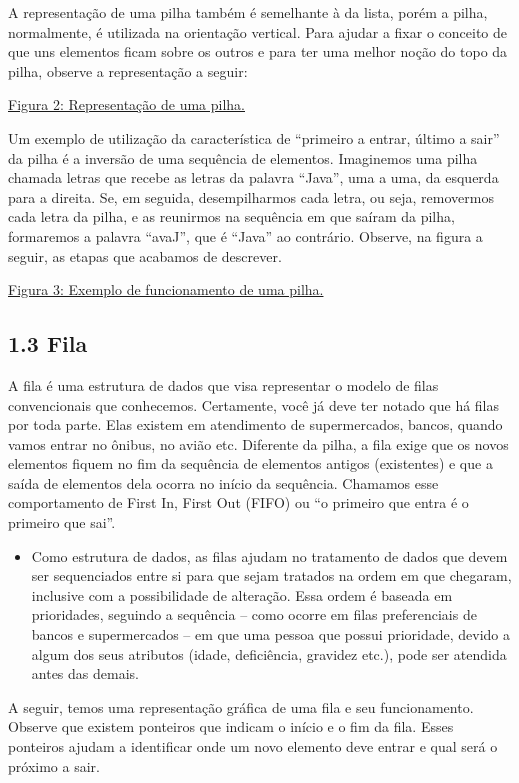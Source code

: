 \documentclass[11pt]{article}
\begin{document}
A representação de uma pilha também é semelhante à da lista, porém a pilha, normalmente, é utilizada na orientação vertical. Para ajudar a fixar o conceito de que uns elementos ficam sobre os outros e para ter uma melhor noção do topo da pilha, observe a representação a seguir:

\href{figura2.png}{Figura 2: Representação de uma pilha.}

Um exemplo de utilização da característica de “primeiro a entrar, último a sair” da pilha é a inversão de uma sequência de elementos. Imaginemos uma pilha chamada letras que recebe as letras da palavra “Java”, uma a uma, da esquerda para a direita. Se, em seguida, desempilharmos cada letra, ou seja, removermos cada letra da pilha, e as reunirmos na sequência em que saíram da pilha, formaremos a palavra “avaJ”, que é “Java” ao contrário. Observe, na figura a seguir, as etapas que acabamos de descrever.

\href{figura3.png}{Figura 3: Exemplo de funcionamento de uma pilha.}

\subsection{1.3 Fila}
\label{sec:orgb6c2567}
A fila é uma estrutura de dados que visa representar o modelo de filas convencionais que conhecemos. Certamente, você já deve ter notado que há filas por toda parte. Elas existem em atendimento de supermercados, bancos, quando vamos entrar no ônibus, no avião etc. Diferente da pilha, a fila exige que os novos elementos fiquem no fim da sequência de elementos antigos (existentes) e que a saída de elementos dela ocorra no início da sequência. Chamamos esse comportamento de First In, First Out (FIFO) ou “o primeiro que entra é o primeiro que sai”.

\begin{itemize}
\item Como estrutura de dados, as filas ajudam no tratamento de dados que devem ser sequenciados entre si para que sejam tratados na ordem em que chegaram, inclusive com a possibilidade de alteração. Essa ordem é baseada em prioridades, seguindo a sequência – como ocorre em filas preferenciais de bancos e supermercados – em que uma pessoa que possui prioridade, devido a algum dos seus atributos (idade, deficiência, gravidez etc.), pode ser atendida antes das demais.
\end{itemize}

A seguir, temos uma representação gráfica de uma fila e seu funcionamento. Observe que existem ponteiros que indicam o início e o fim da fila. Esses ponteiros ajudam a identificar onde um novo elemento deve entrar e qual será o próximo a sair.
\end{document}

